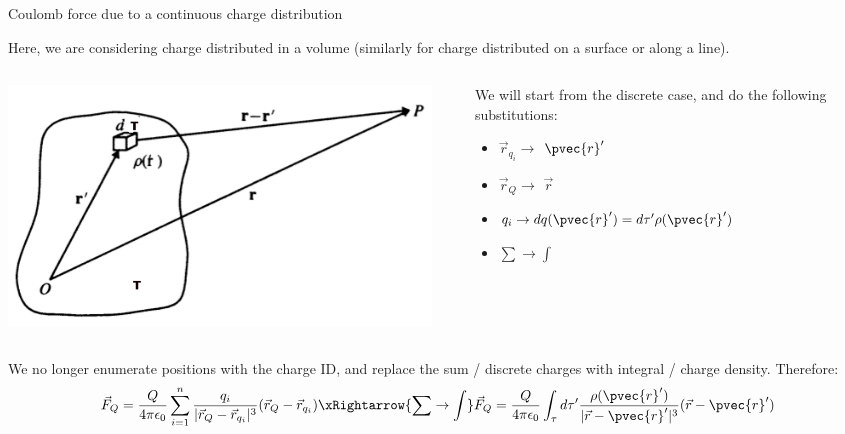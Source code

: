 \begin{frame}{Coulomb force due to a continuous charge distribution}

Here, we are considering charge distributed in a volume
(similarly for charge distributed on a surface or along a line).

\begin{columns}
  \begin{column}{0.60\textwidth}
    \begin{center}
      \includegraphics[width=0.95\textwidth]{./images/schematics/charge_distribution_3d_tau.png}\\
    \end{center}
  \end{column}
  \begin{column}{0.40\textwidth}
     We will start from the discrete case, and do the following substitutions:
     \begin{itemize}
       \item $\vec{r}_{q_i} \rightarrow$ $\pvec{r}'$
       \item $\vec{r}_{Q} \rightarrow$ $\vec{r}$
       \item $q_i \rightarrow dq(\pvec{r}') = d\tau^{\prime} \rho(\pvec{r}')$
       \item $\sum \rightarrow \int$
     \end{itemize}
  \end{column}
\end{columns}

\vspace{0.1cm}
We no longer enumerate positions with the charge ID, and replace the sum / discrete
charges with integral / charge density.
Therefore:
\begin{equation*}
   \vec{F}_{Q} = \frac{Q}{4\pi\epsilon_0} \sum_{i=1}^{n}
      \frac{q_i}{|\vec{r}_{Q}-\vec{r}_{q_{i}}|^{3}} (\vec{r}_{Q}-\vec{r}_{q_{i}})
   \xRightarrow{\sum\rightarrow\int}
   \vec{F}_{Q} = \frac{Q}{4\pi\epsilon_0} \int_{\tau}
      d\tau^{\prime} \frac{\rho({\pvec{r}'})}{|\vec{r}-\pvec{r}'|^{3}} (\vec{r}-\pvec{r}')
\end{equation*}

\end{frame}



